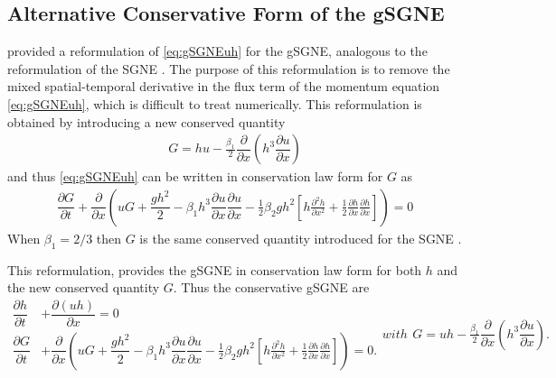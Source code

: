 \documentclass[10pt]{elsarticle}
\begin{document}
\subsection{Alternative Conservative Form of the gSGNE}
\citet{Clamond-Dutykh-2018-237} provided a reformulation of \eqref{eq:gSGNEuh} for the gSGNE, analogous to the reformulation of the SGNE \cite{Zoppou-etal-2017,Hank-etal-2010-2034,Li-2014-169}. The purpose of this reformulation is to remove the mixed spatial-temporal derivative in the flux term of the momentum equation \eqref{eq:gSGNEuh}, which is difficult to treat numerically. This reformulation is obtained by introducing a new conserved quantity
\begin{gather*}
G = hu - \frac{\beta_1}{2} \dfrac{\partial }{\partial x} \left ( h^3 \dfrac{\partial u}{\partial x} \right )
\end{gather*}
and thus \eqref{eq:gSGNEuh} can be written in conservation law form for $G$ as
\begin{gather*}\label{eq:G_momentum}
\dfrac{\partial G }{\partial t}  + \dfrac{\partial}{\partial x} \left ( uG + \dfrac{gh^2}{2} - \beta_1 h^3\dfrac{\partial u}{\partial x}\dfrac{\partial u}{\partial x}  - \frac{1}{2} \beta_2 g h^2  \left[h\frac{\partial^2 h}{\partial x^2} + \frac{1}{2}\frac{\partial h}{\partial x}\frac{\partial h}{\partial x}\right]\right ) = 0
\end{gather*}
When $\beta_1 = 2/3$ then $G$ is the same conserved quantity introduced for the SGNE \cite{Zoppou-etal-2017,Hank-etal-2010-2034,Li-2014-169}.

This reformulation, provides the gSGNE in conservation law form for both $h$ and the new conserved quantity $G$. Thus the conservative gSGNE are
\begin{subequations}
\begin{align}
\dfrac{\partial h}{\partial t} &+ \dfrac{\partial (uh)}{\partial x} = 0  \label{eq:gSGNE_Gh} \\
\dfrac{\partial G }{\partial t} & + \dfrac{\partial}{\partial x} \left ( uG + \dfrac{gh^2}{2} - \beta_1 h^3\dfrac{\partial u}{\partial x}\dfrac{\partial u}{\partial x}  - \frac{1}{2} \beta_2 g h^2  \left[h\frac{\partial^2 h}{\partial x^2} + \frac{1}{2}\frac{\partial h}{\partial x}\frac{\partial h}{\partial x}\right]\right ) = 0.
\label{eq:gSGNE_GG}
\end{align}
with
\begin{gather}\label{eq:G_divergent}
G = uh - \frac{\beta_1}{2}\dfrac{\partial }{\partial x} \left ( h^3 \dfrac{\partial u}{\partial x} \right ).
\end{gather}
\label{eq:gSGNE_G}
\end{subequations}
\end{document}
